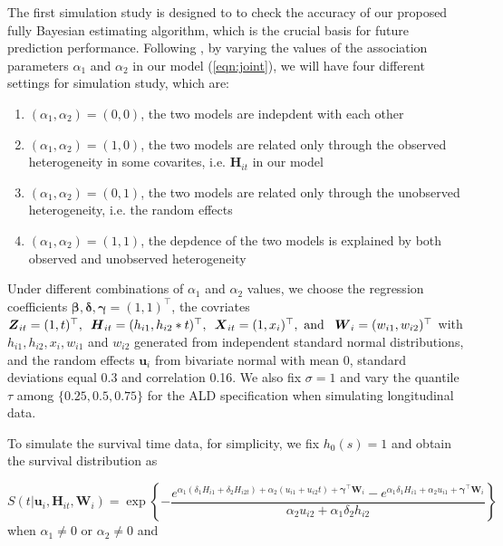 The first simulation study is designed to to check the accuracy of our proposed fully Bayesian estimating algorithm, which is the crucial basis for future prediction performance. Following \cite{Alessio2014qrjm}, by varying the values of the association parameters $\alpha_1$ and $\alpha_2$ in our model (\ref{eqn:joint}), we will have four different settings for simulation study, which are:

\begin{enumerate}
\item $(\alpha_1, \alpha_2)=(0, 0)$, the two models are indepdent with each other
\item $(\alpha_1, \alpha_2)=(1, 0)$, the two models are related only through the observed heterogeneity in some covarites, i.e. ${\boldsymbol H}_{it}$ in our model
\item $(\alpha_1, \alpha_2)=(0, 1)$, the two models are related only through the unobserved heterogeneity, i.e. the random effects
\item $(\alpha_1, \alpha_2)=(1, 1)$, the depdence of the two models is explained by both observed and unobserved heterogeneity
\end{enumerate}




Under different combinations of $\alpha_1$ and $\alpha_2$ values, we choose the regression coefficients $\boldsymbol{\beta, \delta, \gamma}=(1, 1)^{\top}$, the covriates ${\boldsymbol Z}_{it}=(1, t)^{\top},\hspace{0.5em} {\boldsymbol H}_{it}=(h_{i1}, h_{i2}*t)^{\top},\hspace{0.5em} {\boldsymbol X}_{it}=(1, x_i)^{\top},\mbox{ and }\hspace{0.5em} {\boldsymbol W}_{i}=(w_{i1}, w_{i2})^{\top}$ with $h_{i1}, h_{i2}, x_i, w_{i1}$ and $w_{i2}$ generated from independent standard normal distributions, and the random effects  $\boldsymbol{u}_i$ from bivariate normal with mean 0, standard deviations equal 0.3 and correlation 0.16. We also fix $\sigma=1$ and vary the quantile $\tau$ among $\{0.25, 0.5, 0.75\}$ for the ALD specification when simulating longitudinal data.

To simulate the survival time data, for simplicity, we fix $h_0(s)=1$ and obtain the survival distribution as 

\[S(t|\boldsymbol{u}_i, {\boldsymbol H}_{it}, {\boldsymbol W}_i)=\exp\left\{-\frac{e^{\alpha_1(\delta_1H_{i1}+\delta_2H_{i2t}) + \alpha_2(u_{i1}+u_{i2}t) + \boldsymbol{\gamma}^{\top}\boldsymbol{W}_i} - e^{\alpha_1\delta_1H_{i1}+\alpha_2u_{i1} + \boldsymbol{\gamma}^{\top}\boldsymbol{W}_i}}{\alpha_2u_{i2}+\alpha_1\delta_2h_{i2}}\right\}\] when $\alpha_1\ne0$ or $\alpha_2\ne0$ and 

